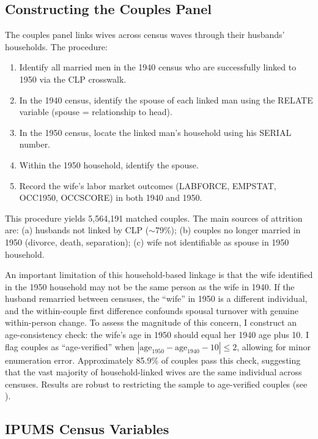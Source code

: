 \documentclass[12pt]{article}
\begin{document}
\subsection{Constructing the Couples Panel}

The couples panel links wives across census waves through their husbands' households. The procedure:

\begin{enumerate}
\item Identify all married men in the 1940 census who are successfully linked to 1950 via the CLP crosswalk.
\item In the 1940 census, identify the spouse of each linked man using the RELATE variable (spouse = relationship to head).
\item In the 1950 census, locate the linked man's household using his SERIAL number.
\item Within the 1950 household, identify the spouse.
\item Record the wife's labor market outcomes (LABFORCE, EMPSTAT, OCC1950, OCCSCORE) in both 1940 and 1950.
\end{enumerate}

This procedure yields 5,564,191 matched couples. The main sources of attrition are: (a) husbands not linked by CLP ($\sim$79\%); (b) couples no longer married in 1950 (divorce, death, separation); (c) wife not identifiable as spouse in 1950 household.

An important limitation of this household-based linkage is that the wife identified in the 1950 household may not be the same person as the wife in 1940. If the husband remarried between censuses, the ``wife'' in 1950 is a different individual, and the within-couple first difference confounds spousal turnover with genuine within-person change. To assess the magnitude of this concern, I construct an age-consistency check: the wife's age in 1950 should equal her 1940 age plus 10. I flag couples as ``age-verified'' when $|\text{age}_{1950} - \text{age}_{1940} - 10| \leq 2$, allowing for minor enumeration error. Approximately 85.9\% of couples pass this check, suggesting that the vast majority of household-linked wives are the same individual across censuses. Results are robust to restricting the sample to age-verified couples (see ).

\subsection{IPUMS Census Variables}
\end{document}
